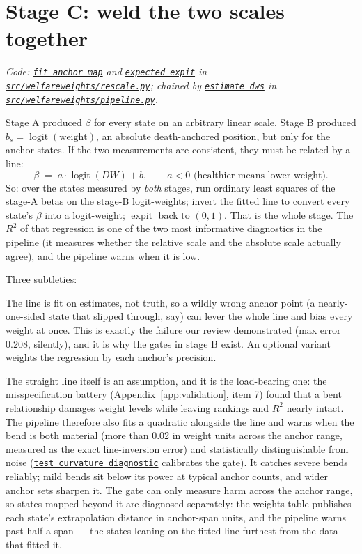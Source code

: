 \documentclass[11pt]{article}
\newcommand{\repo}{https://github.com/welfareweights/engine}
\newcommand{\src}[1]{\href{\repo/blob/main/#1}{\texttt{#1}}}
\newcommand{\fn}[1]{\href{https://github.com/search?q=repo\%3Awelfareweights\%2Fengine+symbol\%3A#1\&type=code}{\texttt{#1}}}
\newcommand{\logit}{\operatorname{logit}}
\newcommand{\expit}{\operatorname{expit}}
\begin{document}
\section{Stage C: weld the two scales together}

\emph{Code: \fn{fit\_anchor\_map} and \fn{expected\_expit} in \src{src/welfareweights/rescale.py}; chained by \fn{estimate\_dws} in \src{src/welfareweights/pipeline.py}.}

Stage A produced $\beta$ for every state on an arbitrary linear scale. Stage B produced $b_s = \logit(\text{weight})$, an absolute death-anchored position, but only for the anchor states. If the two measurements are consistent, they must be related by a line:
\begin{equation}
\beta \;=\; a \cdot \logit(DW) + b, \qquad a < 0 \text{ (healthier means lower weight).}
\end{equation}
So: over the states measured by \emph{both} stages, run ordinary least squares of the stage-A betas on the stage-B logit-weights; invert the fitted line to convert every state's $\beta$ into a logit-weight; $\expit$ back to $(0,1)$. That is the whole stage. The $R^2$ of that regression is one of the two most informative diagnostics in the pipeline (it measures whether the relative scale and the absolute scale actually agree), and the pipeline warns when it is low.

Three subtleties:

The line is fit on estimates, not truth, so a wildly wrong anchor point (a nearly-one-sided state that slipped through, say) can lever the whole line and bias every weight at once. This is exactly the failure our review demonstrated (max error 0.208, silently), and it is why the gates in stage B exist. An optional variant weights the regression by each anchor's precision.

The straight line itself is an assumption, and it is the load-bearing one: the misspecification battery (Appendix~\ref{app:validation}, item 7) found that a bent relationship damages weight levels while leaving rankings and $R^2$ nearly intact. The pipeline therefore also fits a quadratic alongside the line and warns when the bend is both material (more than 0.02 in weight units across the anchor range, measured as the exact line-inversion error) and statistically distinguishable from noise (\fn{test\_curvature\_diagnostic} calibrates the gate). It catches severe bends reliably; mild bends sit below its power at typical anchor counts, and wider anchor sets sharpen it. The gate can only measure harm across the anchor range, so states mapped beyond it are diagnosed separately: the weights table publishes each state's extrapolation distance in anchor-span units, and the pipeline warns past half a span --- the states leaning on the fitted line furthest from the data that fitted it.
\end{document}
